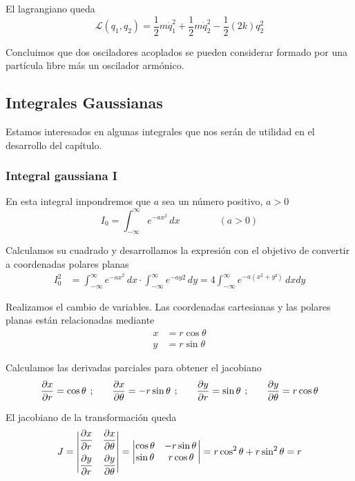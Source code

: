 El lagrangiano queda
\[
  \mathcal{L}(q_1,q_2)
  =
  \dfrac{1}{2}m\dot{q}_1^2
  + \dfrac{1}{2}m\dot{q}_2^2 - \dfrac{1}{2}(2k)q_2^2
\]

Concluimos que dos osciladores acoplados se pueden considerar
formado por una partícula libre más un oscilador armónico.

\subsection{Integrales Gaussianas}
Estamos interesados en algunas integrales que nos serán de utilidad en
el desarrollo del capítulo.

\subsubsection{Integral gaussiana I}
En esta integral impondremos que $a$ sea un número positivo, $a>0$
\[
  I_0 = \int^{\infty}_{-\infty} e^{-ax^2}\,dx
  \hspace{4em}
  (a>0)
\]

Calculamos su cuadrado y desarrollamos la expresión con el objetivo de
convertir a coordenadas polares planas
\begin{align*}
  I_0^2
  &=
    \int^{\infty}_{-\infty} e^{-ax^2}\,dx \cdot \int^{\infty}_{-\infty} e^{-ay2}\,dy
    = 4\int^{\infty}_{-\infty} e^{-a(x^2+y²)}\,dx dy
\end{align*}

Realizamos el cambio de variables. Las coordenadas cartesianas y las
polares planas están relacionadas mediante
\begin{align*}
  x &= r\cos\theta\\
  y &= r\sin\theta
\end{align*}

Calculamos las derivadas parciales para obtener el jacobiano
\begin{align*}
  \dfrac{\partial x}{\partial r} = \cos\theta
  \hspace{0.4em}\text{;}\hspace{2em}
  \dfrac{\partial x}{\partial\theta} = -r\sin\theta
  \hspace{0.4em}\text{;}\hspace{2em}
  \dfrac{\partial y}{\partial r} = \sin\theta
  \hspace{0.4em}\text{;}\hspace{2em}
  \dfrac{\partial y}{\partial\theta} = r\cos\theta
\end{align*}

El jacobiano de la transformación queda
\[
  J
  =
  \begin{vmatrix}
    \dfrac{\partial x}{\partial r} & \dfrac{\partial x}{\partial\theta}\\[2ex]
    \dfrac{\partial y}{\partial r} & \dfrac{\partial y}{\partial\theta}
  \end{vmatrix}
  =
  \begin{vmatrix}
     \cos\theta & -r\sin\theta\kern1.2pt \\
     \sin\theta & r\cos\theta
   \end{vmatrix}
   =
   r\cos^2\theta + r\sin^2\theta = r
\]

